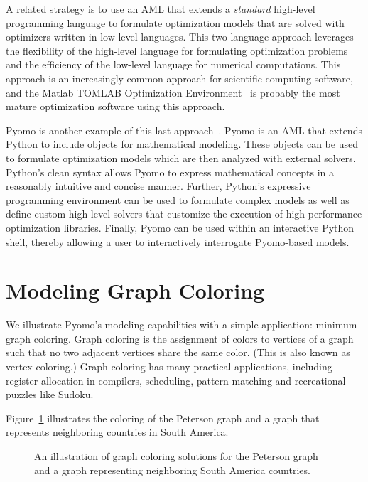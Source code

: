 A related strategy is to use an AML that extends a {\em standard}
high-level programming language to formulate optimization models
that are solved with optimizers written in low-level languages.
This two-language approach leverages the flexibility of the high-level
language for formulating optimization problems and the efficiency of
the low-level language for numerical computations.  This approach is an
increasingly common approach for scientific computing software, and the
Matlab TOMLAB Optimization Environment~\citep{TOMLAB} is probably the
most mature optimization software using this approach.

Pyomo is another example of this last approach~\cite{hartetal11}.  Pyomo is an AML
that extends Python to include objects for mathematical modeling.
These objects can be used to formulate optimization models which are
then analyzed with external solvers.  Python's clean syntax allows Pyomo
to express mathematical concepts in a reasonably intuitive and concise
manner.  Further, Python's expressive programming environment can be used
to formulate complex models as well as define custom high-level solvers
that customize the execution of high-performance optimization libraries.
Finally, Pyomo can be used within an interactive Python shell, thereby
allowing a user to interactively interrogate Pyomo-based models.


\section{Modeling Graph Coloring}

We illustrate Pyomo's modeling capabilities with a simple application:
minimum graph coloring.  Graph coloring is the assignment of colors to
vertices of a graph such that no two adjacent vertices share the same
color.  (This is also known as vertex coloring.)  Graph coloring has
many practical applications, including register allocation in compilers,
scheduling, pattern matching and recreational puzzles like Sudoku.  

Figure~\ref{fig:intro:graph-coloring} illustrates the coloring of the 
Peterson graph and a graph that represents neighboring countries in South America.

\begin{figure}[htb]



\caption{\label{fig:intro:graph-coloring} An illustration of graph coloring solutions for the Peterson graph and a graph representing neighboring South America countries.}

\end{figure}
\fi

